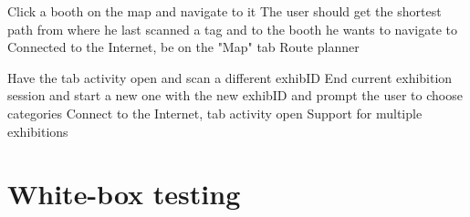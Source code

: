 \testcase
{Click a booth on the map and navigate to it}
{The user should get the shortest path from where he last scanned a tag and to the booth he wants to navigate to}
{Connected to the Internet, be on the "Map" tab}
{Route planner}

\testcase
{Have the tab activity open and scan a different exhibID}
{End current exhibition session and start a new one with the new exhibID and prompt the user to choose categories}
{Connect to the Internet, tab activity open}
{Support for multiple exhibitions}

\section{White-box testing}

